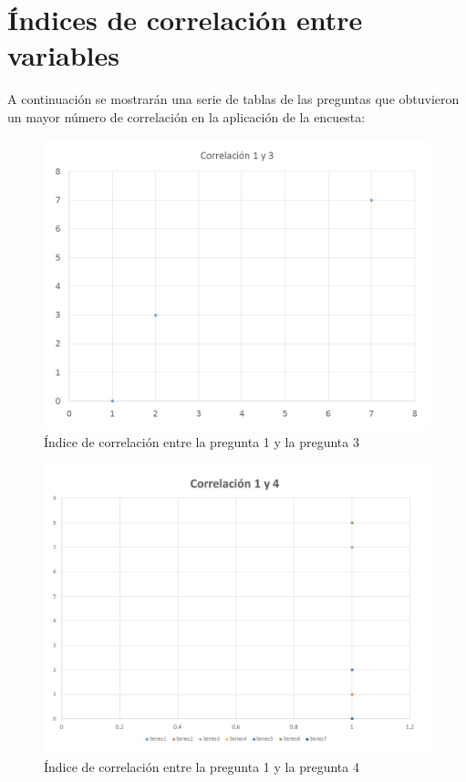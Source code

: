 \documentclass[12pt] {report}
\begin{document}
\section{Índices de correlación entre variables}
A continuación se mostrarán una serie de tablas de las preguntas que obtuvieron un mayor número de correlación en la aplicación de la encuesta:
\begin{figure}[H]
\centering 
\includegraphics[scale=.4]{correlacion13.jpg}
\caption{Índice de correlación entre la pregunta 1 y la pregunta 3}
\end{figure}
\begin{figure}[H]
\centering 
\includegraphics[scale=.4]{correlacion_14.jpg}
\caption{Índice de correlación entre la pregunta 1 y la pregunta 4}
\end{figure}
\end{document}

